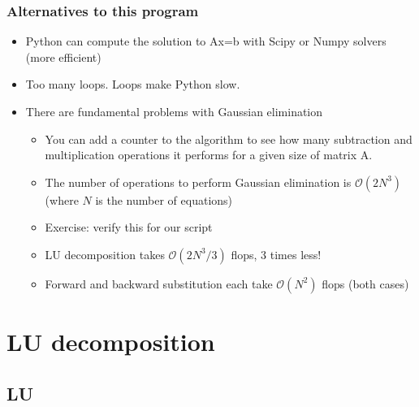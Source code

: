 \begin{frame}[fragile]
  \frametitle{Alternatives to this program}
  \begin{itemize}
    \item Python can compute the solution to Ax=b with Scipy or Numpy solvers (more efficient)
    \item Too many loops. Loops make Python slow.
    \item There are fundamental problems with Gaussian elimination\pause
    \begin{itemize}
      \item You can add a counter to the algorithm to see how many subtraction and multiplication operations it performs for a given size of matrix A.
      \item The number of operations to perform Gaussian elimination is $\mathcal{O}(2N^3)$ (where $N$ is the number of equations) 
      \item Exercise: verify this for our script \pause
      \item LU decomposition takes $\mathcal{O}(2N^3/3)$ flops, 3 times less!
      \item Forward and backward substitution each take $\mathcal{O}(N^2)$
flops (both cases) 
    \end{itemize}
  \end{itemize}
\end{frame}

\section{LU decomposition}
\subsection*{LU}

